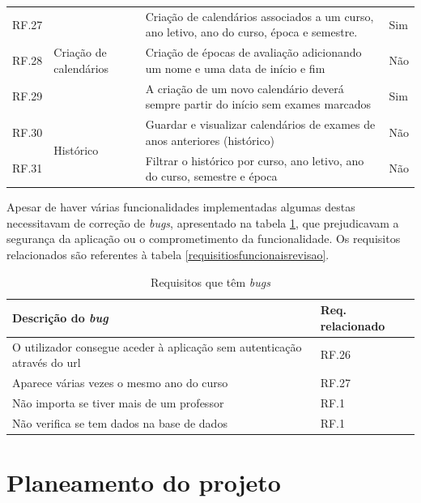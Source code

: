 \documentclass[12pt, twoside]{report}
\begin{document}
\begin{center}
\begin{longtable}{|m{1cm}|m{2.2cm}|m{9cm}|m{3cm}|}
			RF.27 &\multirow{3}{2cm}{Criação de calendários}&Criação de calendários associados a um curso, ano letivo, ano do curso, época e semestre.& Sim \\
			
			RF.28 && Criação de épocas de avaliação adicionando um nome e uma data de início e fim & Não \\
			
			RF.29 && A criação de um novo calendário deverá sempre partir do início sem exames marcados & Sim\\
			\hline
			RF.30 &\multirow{2}{*}{Histórico}& Guardar e visualizar calendários de exames de anos anteriores (histórico)& Não \\
			
			RF.31 && Filtrar o histórico por curso, ano letivo, ano do curso, semestre e época& Não \\
			\hline
		\end{longtable}
	\end{center}
	
	Apesar de haver várias funcionalidades implementadas algumas destas necessitavam de correção de \textit{bugs}, apresentado na tabela \ref{revisaodaaplicacaobugs}, que prejudicavam a segurança da aplicação ou o comprometimento da funcionalidade. Os requisitos relacionados são referentes à tabela \ref{requisitiosfuncionaisrevisao}.
	
		\begin{table}[H]
		\caption{Requisitos que têm \textit{bugs}}
		
		\begin{center}
			\begin{tabularx}{\textwidth}{|X|X|}
				\hline
				\textbf{Descrição do \textit{bug}} & \textbf{Req. relacionado} \\
				\hline
				O utilizador consegue aceder à aplicação sem autenticação através do url & RF.26\\
				\hline
				Aparece várias vezes o mesmo ano do curso & RF.27\\
				\hline
				Não importa se tiver mais de um professor & RF.1\\
				\hline
				Não verifica se tem dados na base de dados & RF.1\\
				\hline
			\end{tabularx}
			\label{revisaodaaplicacaobugs}
		\end{center}
	\end{table}
	
	\section{Planeamento do projeto}
	
\end{document}
